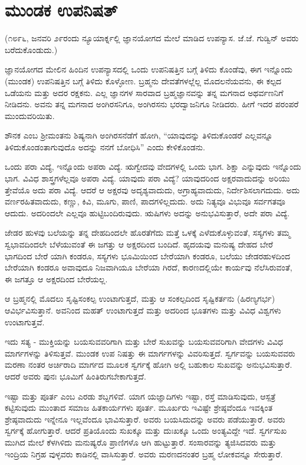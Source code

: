 
\chapter{ಮುಂಡಕ ಉಪನಿಷತ್}

(೧೮೯೬, ಜನವರಿ ೨೯ರಂದು ನ್ಯೂಯಾರ್ಕ್ನಲ್ಲಿ ಜ್ಞಾನಯೋಗದ ಮೇಲೆ ಮಾಡಿದ ಉಪನ್ಯಾಸ. ಜೆ.ಜೆ. ಗುಡ್ವಿನ್ ಅವರು ಬರೆದುಕೊಂಡುದು.)

ಜ್ಞಾನಯೋಗದ ಮೇಲಿನ ಹಿಂದಿನ ಉಪನ್ಯಾಸದಲ್ಲಿ ಒಂದು ಉಪನಿಷತ್ತಿನ ಬಗ್ಗೆ ತಿಳಿದು ಕೊಂಡೆವು, ಈಗ ಇನ್ನೊಂದು (ಮುಂಡಕ) ಉಪನಿಷತ್ತಿನ ಬಗ್ಗೆ ತಿಳಿದು ಕೊಳ್ಳೋಣ. ಬ್ರಹ್ಮನು ದೇವತೆಗಳಲ್ಲೆಲ್ಲ ಮೊದಲನೆಯವನು, ಈ ಕಲ್ಪದ ಒಡೆಯನು ಮತ್ತು ಅದರ ರಕ್ಷಕನು. ಎಲ್ಲ ಜ್ಞಾನಗಳ ಸಾರವಾದ ಬ್ರಹ್ಮಜ್ಞಾನವನ್ನು ತನ್ನ ಮಗನಾದ ಅಥರ್ವಣನಿಗೆ ನೀಡಿದನು. ಅವನು ತನ್ನ ಮಗನಾದ ಅಂಗಿರಸನಿಗೂ, ಅಂಗಿರಸನು ಭರದ್ವಾಜನಿಗೂ ನೀಡಿದರು. ಹೀಗೆ ಇದರ ಪರಂಪರೆ ಮುಂದುವರಿಯಿತು.

ಶೌನಕ ಎಂಬ ಶ‍್ರೀಮಂತನು ಶಿಷ್ಯನಾಗಿ ಅಂಗಿರಸನೆಡೆಗೆ ಹೋಗಿ, “ಯಾವುದನ್ನು ತಿಳಿದುಕೊಂಡರೆ ಎಲ್ಲವನ್ನೂ ತಿಳಿದುಕೊಂಡಂತಾಗುವುದೊ ಅದನ್ನು ನನಗೆ ಬೋಧಿಸಿ” ಎಂದು ಕೇಳಿಕೊಂಡನು.

ಒಂದು ಪರಾ ವಿದ್ಯೆ, ಇನ್ನೊಂದು ಅಪರಾ ವಿದ್ಯೆ. ಋಗ್ವೇದವು ವೇದಗಳಲ್ಲಿ ಒಂದು ಭಾಗ. ಶಿಕ್ಷಾ ಎನ್ನುವುದು ಇನ್ನೊಂದು ಭಾಗ. ವಿವಿಧ ಶಾಸ್ತ್ರಗಳೆಲ್ಲವೂ ಅಪರಾ ವಿದ್ಯೆ. ಯಾವುದು ಪರಾ ವಿದ್ಯೆ? ಯಾವುದರಿಂದ ಅಕ್ಷರವಾದುದನ್ನು ಅರಿಯು ತ್ತೇವೆಯೊ ಅದು ಪರಾ ವಿದ್ಯೆ. ಆದರೆ ಆ ಅಕ್ಷರವು ಅದೃಶ್ಯವಾದುದು, ಅಗ್ರಾಹ್ಯವಾದುದು, ನಿರ್ದೇಶಿಸಲಾಗದುದು. ಅದು ವರ್ಣರಹಿತವಾದುದು, ಕಣ್ಣು, ಕಿವಿ, ಮೂಗು, ಪಾಣಿ, ಪಾದಗಳಿಲ್ಲದುದು. ಅದು ನಿತ್ಯವೂ ವಿಭುವೂ ಸರ್ವಗತವೂ ಆದುದು. ಅದರಿಂದಲೇ ಎಲ್ಲವೂ ಹುಟ್ಟಿಬಂದಿರುವುದು. ಋಷಿಗಳು ಅದನ್ನು ಅನುಭವಿಸುತ್ತಾರೆ, ಅದೇ ಪರಾ ವಿದ್ಯೆ.

ಜೇಡರ ಹುಳವು ಬಲೆಯನ್ನು ತನ್ನ ದೇಹದಿಂದಲೇ ಹೊರತೆಗೆದು ಮತ್ತೆ ಒಳಕ್ಕೆ ಎಳೆದುಕೊಳ್ಳುವಂತೆ, ಸಸ್ಯಗಳು ತಮ್ಮ ಸ್ವಭಾವದಿಂದಲೇ ಬೆಳೆಯುವಂತೆ ಈ ಜಗತ್ತು ಆ ಅಕ್ಷರದಿಂದ ಬಂದಿದೆ. ಹೃದಯವು ಮನುಷ್ಯ ದೇಹದ ಬೇರೆ ಭಾಗದಿಂದ ಬೇರೆ ಯಾಗಿ ಕಂಡರೂ, ಸಸ್ಯಗಳು ಭೂಮಿಯಿಂದ ಬೇರೆಯಾಗಿ ಕಂಡರೂ, ಬಲೆಯು ಜೇಡರಹುಳದಿಂದ ಬೇರೆಯಾಗಿ ಕಂಡರೂ ಅವಾವುದೂ ನಿಜವಾಗಿಯೂ ಬೇರೆಯಾ ಗಿರದೆ, ಕಾರಣದಲ್ಲಿಯೇ ಕಾರ್ಯವು ನೆಲೆಸಿರುವಂತೆ, ಈ ಜಗತ್ತೂ ಆ ಅಕ್ಷರದಿಂದ ಬೇರೆಯಲ್ಲ.

ಆ ಬ್ರಹ್ಮನಲ್ಲಿ ಮೊದಲು ಸೃಷ್ಟಿಸಂಕಲ್ಪ ಉಂಟಾಗುತ್ತದೆ, ಮತ್ತು ಆ ಸಂಕಲ್ಪದಿಂದ ಸೃಷ್ಟಿಕರ್ತನು (ಹಿರಣ್ಯಗರ್ಭ) ಆವಿರ್ಭವಿಸುತ್ತಾನೆ. ಅವನಿಂದ ಮಹತ್ ಉಂಟಾಗುತ್ತದೆ ಮತ್ತು ಅದರಿಂದ ಭೂತಗಳು ಮತ್ತು ವಿವಿಧ ವಿಶ್ವಗಳು ಉಂಟಾಗುತ್ತವೆ.

ಇದು ಸತ್ಯ - ಮುಕ್ತಿಯನ್ನು ಬಯಸುವವರಿಗಾಗಿ ಮತ್ತು ಬೇರೆ ಸುಖವನ್ನು ಬಯಸುವವರಿಗಾಗಿ ವೇದಗಳು ವಿವಿಧ ಮಾರ್ಗಗಳನ್ನು ತಿಳಿಸುತ್ತವೆ. ಮುಂಡಕ ಉಪ ನಿಷತ್ತು ಈ ಮಾರ್ಗಗಳನ್ನು ವಿವರಿಸುತ್ತದೆ. ಸ್ವರ್ಗವನ್ನು ಬಯಸುವವರು ಮರಣಾ ನಂತರ ಅರ್ಚಿರಾದಿ ಮಾರ್ಗದ ಮೂಲಕ ಸ್ವರ್ಗಕ್ಕೆ ಹೋಗಿ ಅಲ್ಲಿ ಬಹುಕಾಲ ಸುಖವನ್ನು ಅನುಭವಿಸುತ್ತಾರೆ. ಆದರೆ ಅವರು ಪುನಃ ಭೂಮಿಗೆ ಹಿಂತಿರುಗಬೇಕಾಗುತ್ತದೆ.

ಇಷ್ಟಾ ಮತ್ತು ಪೂರ್ತ ಎಂಬ ಎರಡು ಶಬ್ದಗಳಿವೆ. ಯಾಗ ಯಜ್ಞಾದಿಗಳು ಇಷ್ಟಾ, ರಸ್ತೆ ಮಾಡಿಸುವುದು, ಆಸ್ಪತ್ರೆ ಕಟ್ಟಿಸುವುದು ಮುಂತಾದ ಸಮಾಜ ಹಿತಕಾರ್ಯಗಳು ಪೂರ್ತ. ಮೂರ್ಖರು ಇವಿಷ್ಟೇ ಶ್ರೇಷ್ಠವೆಂದೂ ಇವಕ್ಕಿಂತ ಶ್ರೇಷ್ಠವಾದುದು ಇನ್ನೇನೂ ಇಲ್ಲವೆಂದೂ ಭಾವಿಸುತ್ತಾರೆ. ಅವರು ಬಯಸಿದುದನ್ನು ಅವರು ಪಡೆಯುತ್ತಾರೆ. ಅವರು ಸ್ವರ್ಗಕ್ಕೆ ಹೋಗುತ್ತಾರೆ. ಆದರೆ ಪ್ರತಿಯೊಂದು ಸುಖಕ್ಕೂ ಮತ್ತು ದುಃಖಕ್ಕೂ ಒಂದು ಅಂತ್ಯವಿದ್ದೇ ಇದೆ. ಸ್ವರ್ಗಸುಖ ಮುಗಿದ ಮೇಲೆ ಕೆಳಗಿಳಿದು ಮನುಷ್ಯರೊ ಪ್ರಾಣಿಗಳೊ ಆಗಿ ಹುಟ್ಟುತ್ತಾರೆ. ಸಂಸಾರವನ್ನು ತ್ಯಜಿಸಿದವರು ಮತ್ತು ಇಂದ್ರಿಯ ನಿಗ್ರಹ ವುಳ್ಳವರು ಕಾಡಿನಲ್ಲಿ ವಾಸಿಸುತ್ತಾರೆ. ಅವರು ಮರಣದನಂತರ ಬ್ರಹ್ಮ ಲೋಕವನ್ನೂ ಸೇರುತ್ತಾರೆ.

